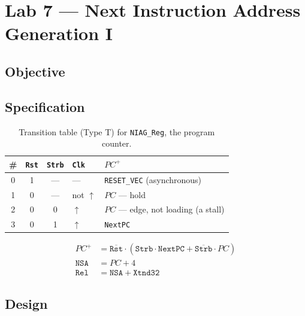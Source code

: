 
\chapter{Lab 7 --- Next Instruction Address Generation I}

\section{Objective}

\section{Specification}

\begin{table}[htbp]
\centering
\caption{Transition table (Type T) for \texttt{NIAG\_Reg}, the program counter.}
\label{tab:lab07-truth}
\begin{tabular}{cccl||l}
\toprule
\# & \texttt{Rst} & \texttt{Strb} & \texttt{Clk} & $PC^{+}$ \\
\midrule
0 & 1 & --- & --- & \texttt{RESET\_VEC} (asynchronous) \\
1 & 0 & --- & not $\uparrow$ & $PC$ --- hold \\
2 & 0 & 0 & $\uparrow$ & $PC$ --- edge, not loading (a stall) \\
3 & 0 & 1 & $\uparrow$ & \texttt{NextPC} \\
\bottomrule
\end{tabular}
\end{table}

\begin{align*}
PC^{+} &= \overline{\texttt{Rst}} \cdot \left( \texttt{Strb}\cdot\texttt{NextPC} + \overline{\texttt{Strb}}\cdot PC \right) \\
\texttt{NSA} &= PC + 4 \\
\texttt{Rel} &= \texttt{NSA} + \texttt{Xtnd32}
\end{align*}


\section{Design}

